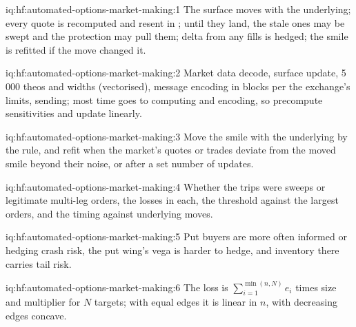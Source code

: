 \begin{solution}{iq:hf:automated-options-market-making:1}
The surface moves with the underlying; every quote is recomputed and resent in ; until they land, the stale ones may be swept and the
protection may pull them; delta from any fills is hedged; the smile is refitted if the move changed it.
\end{solution}

\begin{solution}{iq:hf:automated-options-market-making:2}
Market data decode, surface update, 5\,000 theos and widths (vectorised), message encoding in blocks per the exchange's limits, sending; most time goes
to computing and encoding, so precompute sensitivities and update linearly.
\end{solution}

\begin{solution}{iq:hf:automated-options-market-making:3}
Move the smile with the underlying by the rule, and refit when the market's quotes or trades deviate from the moved smile beyond their noise, or
after a set number of updates.
\end{solution}

\begin{solution}{iq:hf:automated-options-market-making:4}
Whether the trips were sweeps or legitimate multi-leg orders, the losses in each, the threshold against the largest orders, and the timing against
underlying moves.
\end{solution}

\begin{solution}{iq:hf:automated-options-market-making:5}
Put buyers are more often informed or hedging crash risk, the put wing's vega is harder to hedge, and inventory there carries tail risk.
\end{solution}

\begin{solution}{iq:hf:automated-options-market-making:6}
The loss is $\sum_{i=1}^{\min(n,N)}e_i$ times size and multiplier for $N$ targets; with equal edges it is linear in $n$, with decreasing edges
concave.
\end{solution}
